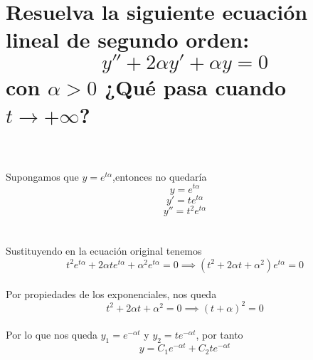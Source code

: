 \section{Resuelva la siguiente ecuación lineal de segundo orden:
$$y'' + 2\alpha y' + \alpha y = 0$$
con $\alpha > 0$ ¿Qué pasa cuando $t \rightarrow +\infty$?}
\\
\\Supongamos que $y = e^{t\alpha}$,entonces no quedaría 
$$y = e^{t\alpha}$$
$$y' = t e^{t\alpha}$$
$$ y'' = t^2 e^{t\alpha}$$
\\
\\Sustituyendo en la ecuación original tenemos
$$t^2 e^{t\alpha} + 2\alpha te^{t\alpha} + \alpha ^2 e^{t\alpha} = 0 \implies \left (t^2 + 2\alpha t + \alpha^2 \right) e^{t\alpha} = 0$$
\\ Por propiedades de los exponenciales, nos queda
$$t^2 + 2\alpha t + \alpha ^2 = 0 \implies \left(t + \alpha \right)^2 = 0$$
\\Por lo que nos queda $y_1 = e^{- \alpha t}$ y $y_2 = te^{- \alpha t}$, por tanto
$$y = C_1 e^{- \alpha t} + C_2 te^{- \alpha t}$$